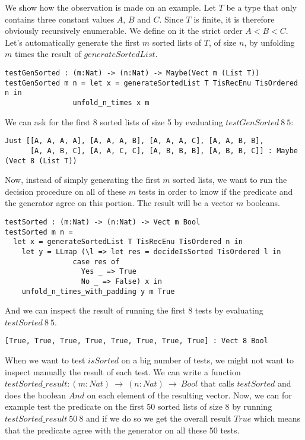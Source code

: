 We show how the observation is made on an example. Let $T$ be a type that only contains three constant values $A$, $B$ and $C$. Since $T$ is finite, it is therefore obviously recursively enumerable. We define on it the strict order $A < B < C$.
Let's automatically generate the first $m$ sorted lists of $T$, of size $n$, by unfolding $m$ times the result of $generateSortedList$.


\begin{lstlisting}
testGenSorted : (m:Nat) -> (n:Nat) -> Maybe(Vect m (List T))
testGenSorted m n = let x = generateSortedList T TisRecEnu TisOrdered n in
		      	unfold_n_times x m
\end{lstlisting}
We can ask for the first 8 sorted lists of size 5 by evaluating $testGenSorted\ 8\ 5$:

\begin{lstlisting}
Just [[A, A, A, A], [A, A, A, B], [A, A, A, C], [A, A, B, B],
      [A, A, B, C], [A, A, C, C], [A, B, B, B], [A, B, B, C]] : Maybe (Vect 8 (List T))
\end{lstlisting}
Now, instead of simply generating the first $m$ sorted lists, we want to run the decision procedure on all of these $m$ tests in order to know if the predicate and the generator agree on this portion. The result will be a vector $m$ booleans.

\begin{lstlisting}
testSorted : (m:Nat) -> (n:Nat) -> Vect m Bool
testSorted m n = 
  let x = generateSortedList T TisRecEnu TisOrdered n in
    let y = LLmap (\l => let res = decideIsSorted TisOrdered l in
			    case res of
			      Yes _ => True
			      No _ => False) x in
	unfold_n_times_with_padding y m True
\end{lstlisting}
And we can inspect the result of running the first 8 tests by evaluating $testSorted\ 8\ 5$.

\begin{lstlisting}
[True, True, True, True, True, True, True, True] : Vect 8 Bool
\end{lstlisting}
When we want to test $isSorted$ on a big number of tests, we might not want to inspect manually the result of each test. We can write a function $testSorted\_result : (m:Nat)\ \rightarrow\ (n:Nat)\ \rightarrow\ Bool$ that calls $testSorted$ and does the boolean $And$ on each element of the resulting vector. Now, we can for example test the predicate on the first 50 sorted lists of size 8 by running $testSorted\_result\ 50\ 8$ and if we do so we get the overall result $True$ which means that the predicate agree with the generator on all these 50 tests.


